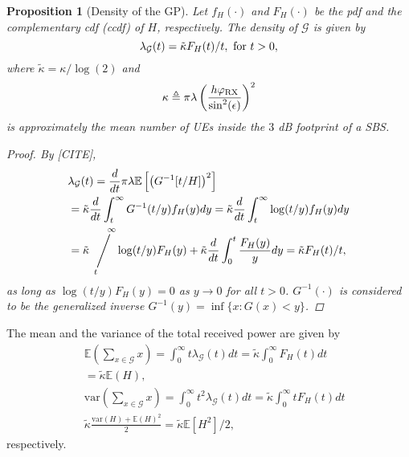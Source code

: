 \documentclass[conference]{IEEEtran}
\newcommand{\viiva}{\mathop{\Bigg/}}
\newcommand{\sij}[3]{\viiva\limits_{\hspace*{-5mm}{#1}}^{\hspace*{5mm}{#2}}{#3}}
\theoremstyle{definition}
\theoremstyle{plain}
\newtheorem{prop}[thm4]{Proposition}
\begin{document}
          \begin{prop}[Density of the GP]
            Let $f_H(\cdot)$ and $F_H(\cdot)$ be the pdf and the complementary cdf (ccdf) of $H$, respectively. The density of $\mathcal{G}$ is given by
            \begin{equation}
              \label{eq:GPdensity}
              \lambda_{\mathcal{G}}(t)= \tilde{\kappa}F_H(t)/t, \text{ \text{for} }t>0,
            \end{equation}
            where $\tilde{\kappa}= \kappa/\log(2)$ and
            \begin{equation}
              \label{eq:kappa}
                    {\kappa} \triangleq    \pi \lambda   \left(\frac{h \varphi_{\textup{RX}}}{\sin^2(\epsilon)  }\right)^2
            \end{equation}
            is approximately the mean number of UEs inside the $3$ dB footprint of a SBS.
            
            \begin{proof}
              By [CITE],
              \begin{align*}
                &\lambda_{\mathcal{G}}(t) \overset{}{=} \frac{d}{dt}\pi \lambda \mathbb{E}\left[\left( G^{-1}[t/H] \right)^2 \right] \\
                &=\tilde{\kappa}\frac{d}{dt} \int_t^{\infty} G^{-1}(t/y)f_H(y) dy  = \tilde{\kappa}\frac{d}{dt} \int_t^{\infty} \log(t/y)f_H(y) dy\\ &= \tilde{\kappa} \sij{t}{\infty} \log(t/y)F_H(y) + \tilde{\kappa} \frac{d}{dt} \int_0^{t}\frac{F_H(y)}{y} dy =  \tilde{\kappa}F_H(t)/t,
              \end{align*}
            as long as $\log(t/y) F_H(y) =0$ as $y \rightarrow 0$ for all $t>0$.  $G^{-1}(\cdot)$ is considered to be the generalized inverse $G^{-1}(y) = \inf \{x:G(x)<y\}$.
              \end{proof}
          \end{prop}

          The mean and the variance of the total received power are given by
          \begin{align}
            &\mathbb{E}\left(\sum_{x \in \mathcal{G}} x \right) = \int_{0}^{\infty} t\lambda_{\mathcal{G}}(t) dt = \tilde{\kappa} \int_{0}^{\infty}F_H(t) dt \nonumber \\
            &=\tilde{\kappa} \mathbb{E}(H), \\\
            &\text{var}\left(\sum_{x \in \mathcal{G}} x \right) = \int_{0}^{\infty} t^2\lambda_{\mathcal{G}}(t) dt= \tilde{\kappa} \int_0^{\infty}tF_H(t) dt  \nonumber \\
           & \tilde{\kappa} \frac{\text{var}(H) + \mathbb{E}(H)^2}{2} = \tilde{\kappa}  \mathbb{E}[H^2]/2,
          \end{align}
          respectively. 
\end{document}
